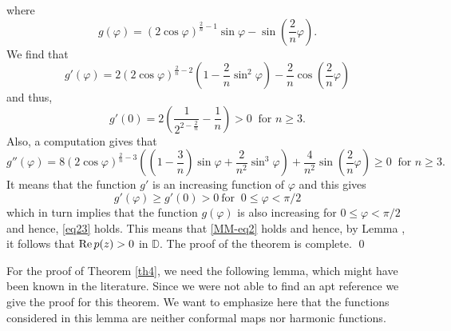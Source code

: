 \documentclass[a4paper,12pt]{amsart}
\theoremstyle{definition}
\newcounter {own}
\newcounter{tmp}
\begin{document}
where
$$g(\varphi)=(2\cos\varphi)^{\frac{2}{n}-1}\sin\varphi-\sin\left(\frac{2}{n}\varphi\right).
$$
We find that
$$g'(\varphi)=2(2\cos\varphi)^{\frac{2}{n}-2}\left(1-\frac{2}{n}\sin^{2}\varphi\right)-\frac{2}{n}\cos\left(\frac{2}{n}\varphi\right)
$$
and thus,
$$g'(0)=2\left(\frac{1}{2^{2-\frac{2}{n}}}-\frac{1}{n}\right)>0~\mbox{ for $n\geq 3$.}
$$
Also, a computation gives that
$$g''(\varphi)=8(2\cos\varphi)^{\frac{2}{n}-3}\left(\left(1-\frac{3}{n}\right)\sin \varphi
+\frac{2}{n^{2}}\sin^{3}\varphi\right)+\frac{4}{n^{2}}\sin \left(\frac{2}{n}\varphi\right)\geq 0~\mbox{ for $n\geq 3$.}
$$
It means that the function $g'$ is an increasing function of $\varphi$ and this gives
$$g'(\varphi)\geq g'(0)>0  ~\mbox{for }~ 0\leq\varphi<\pi/2
$$
which in turn implies that the function $g(\varphi)$ is also increasing for $0\leq\varphi<\pi/2$ and  hence, \eqref{eq23} holds.
This means that \eqref{MM-eq2} holds and hence, by Lemma {}, it follows that
${\rm Re}\,p(z)>0$ in ${{\mathbb D}}$.  The proof of the theorem is complete.
\qed

\vspace{8pt}

For the proof of Theorem \ref{th4}, we need the following lemma, which might have been known in the literature.
Since we were not able to find an apt reference we give the proof for this theorem.
We want to emphasize here that the functions considered in this lemma are neither conformal maps nor harmonic functions.
\end{document}
